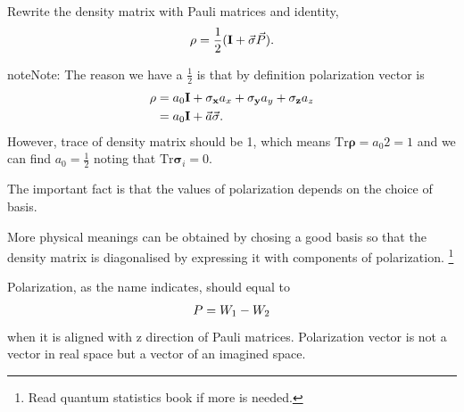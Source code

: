 \documentclass[letterpaper,12pt,english]{sphinxmanual}
\begin{document}
Rewrite the density matrix with Pauli matrices and identity,
\begin{gather}
\begin{split}\mathbf \rho = \frac{1}{2} ( \mathbf I + \vec{\mathbf \sigma} \vec P ).\end{split}\notag
\end{gather}
\begin{notice}{note}{Note:}
The reason we have a \(\frac{1}{2}\) is that by definition polarization vector is
\begin{gather}
\begin{split}\mathbf \rho &= a_0 \mathbf I + \mathbf {\sigma_x} a_x +  \mathbf {\sigma_y} a_y +  \mathbf {\sigma_z} a_z \\
& = a_0 \mathbf I + \vec a \vec{\mathbf \sigma}.\end{split}\notag
\end{gather}
However, trace of density matrix should be 1, which means \(\mathrm{Tr} \mathbf \rho = a_0 2 =1\) and we can find \(a_0=\frac{1}{2}\) noting that \(\mathrm {Tr}\mathbf \sigma_i = 0\).
\end{notice}

The important fact is that the values of polarization depends on the choice of basis.

More physical meanings can be obtained by chosing a good basis so that the density matrix is diagonalised by expressing it with components of polarization. \footnote{
Read quantum statistics book if more is needed.
}

Polarization, as the name indicates, should equal to
\begin{gather}
\begin{split}P = W_1 - W_2\end{split}\notag
\end{gather}
when it is aligned with z direction of Pauli matrices. Polarization vector is not a vector in real space but a vector of an imagined space.
\end{document}
